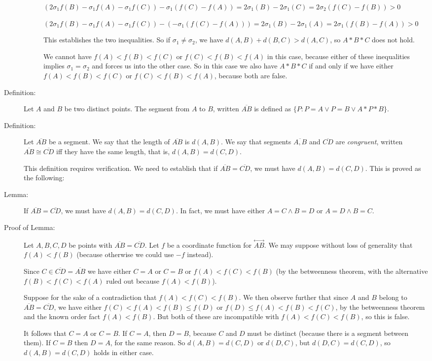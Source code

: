 \documentclass[12pt]{article}
\newcommand\Line[1]{\overset{\leftrightarrow}{#1}}
\begin{document}
\begin{description}
\begin{description}
$(2\sigma_1f(B) - \sigma_1f(A) - \sigma_1f(C)) - \sigma_1(f(C)-f(A)) = 2\sigma_1(B) - 2 \sigma_1(C) = 2\sigma_2(f(C)-f(B)) >0$

$(2\sigma_1f(B) - \sigma_1f(A) - \sigma_1f(C)) - (-\sigma_1(f(C)-f(A))) = 2\sigma_1(B) - 2 \sigma_1(A) = 2\sigma_1(f(B)-f(A)) >0$

This establishes the two inequalities.  So if $\sigma_1 \neq \sigma_2$, we have $d(A,B)+d(B,C)>d(A,C)$, so $A*B*C$ does not hold.

We cannot have $f(A) < f(B) < f(C)$ or $f(C)<f(B)<f(A)$ in this case, because either of these inequalities implies $\sigma_1 = \sigma_2$ and forces us into the other case.  So in this case we also have $A*B*C$  if and only if
we have either $f(A) < f(B) < f(C)$ or $f(C)<f(B)<f(A)$, because both are false.
\end{description}

\item[Definition:]  Let $A$ and $B$ be two distinct points.  The segment from $A$ to $B$, written $\overline{AB}$ is defined as $\{P: P = A \vee P = B \vee A * P * B\}$.

\item[Definition:]  Let $\overline{AB}$ be a segment.   We say that the length of $\overline{AB}$ is $d(A,B)$.  We say that segments $\overline{A,B}$ and $\overline{CD}$ are {\em congruent\/}, written $\overline{AB} \cong \overline{CD}$ iff they have the same length, that is, $d(A,B) = d(C,D)$.

This definition requires verification.  We need to establish that if $\overline{AB} = \overline{CD}$, we must have $d(A,B) = d(C,D)$.  This is proved as the following:

\item[Lemma:]  If $\overline{AB} = \overline{CD}$, we must have $d(A,B) = d(C,D)$.  In fact, we must have either $A=C \wedge B=D$ or $A=D \wedge B=C$.

\item[Proof of Lemma:]  Let $A,B,C,D$ be points with $\overline{AB} = \overline{CD}$.  Let $f$ be a coordinate function for $\Line{AB}$.  We may suppose without loss of generality that $f(A) < f(B)$ (because otherwise we could use $-f$ instead).

Since $C \in \overline{CD} = \overline{AB}$ we have either $C=A$ or $C=B$ or $f(A)<f(C)<f(B)$ (by the betweenness theorem, with the alternative $f(B) < f(C) < f(A)$ ruled out because $f(A) < f(B)$).

Suppose for the sake of a contradiction that $f(A)<f(C)<f(B)$.  We then observe further that since $A$ and $B$ belong to $\overline{AB} = \overline{CD}$, we
have either $f(C) < f(A) < f(B) \leq f(D)$ or $f(D) \leq f(A) < f(B) <f(C)$, by the betweenness theorem and the known order fact $f(A) < f(B)$.  But both of these are incompatible with $f(A)<f(C)<f(B)$, so this is false.

It follows that $C=A$ or $C=B$.  If $C=A$, then $D=B$, because $C$ and $D$ must be distinct (because there is a segment between them).  If $C=B$ then $D=A$, for the same reason.  So $d(A,B) = d(C,D)$ or $d(D,C)$, but $d(D,C)=d(C,D)$, so $d(A,B) = d(C,D)$ holds in either case.

\end{description}
\end{document}
